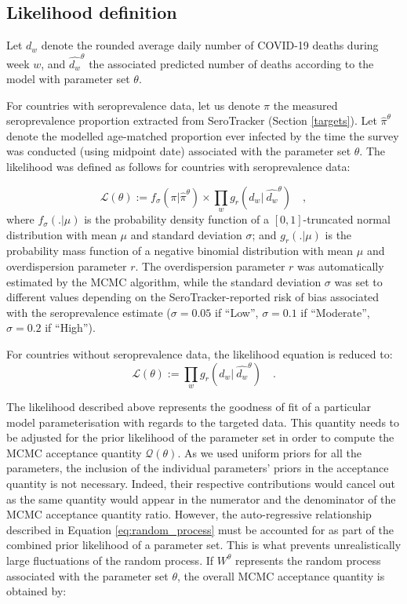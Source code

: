 

\subsection{Likelihood definition}
\label{likelihood}
Let $d_w$ denote the rounded average daily number of COVID-19 deaths during week $w$, and $\hat{d_w}^\theta$ 
the associated predicted number of deaths according to the model with parameter set $\theta$. 

For countries with seroprevalence data, let us denote $\pi$ the measured seroprevalence proportion extracted from SeroTracker (Section \ref{targets}). 
Let $\hat{\pi}^\theta$ denote the modelled age-matched proportion ever infected by the time the survey was conducted (using midpoint date) 
associated with the parameter set $\theta$. 
The likelihood was defined as follows for countries with seroprevalence data:

\begin{equation}
    \label{eq:likelihood}
    \mathcal{L}(\theta) := f_{\sigma}(\pi | \hat{\pi}^\theta) \times \prod_w g_r(d_w | \:\hat{d_w}^\theta) \quad ,
\end{equation}
where $f_{\sigma}( . | \mu )$ is the probability density function of a $[0, 1]$-truncated normal distribution with mean $\mu$ and standard deviation $\sigma$; and 
$g_r(. | \mu)$ is the probability mass function of a negative binomial distribution with mean $\mu$ and 
overdispersion parameter $r$. The overdispersion parameter $r$ was automatically estimated by the MCMC algorithm, while the standard deviation $\sigma$ was set to different 
values depending on the SeroTracker-reported risk of bias associated with the seroprevalence estimate ($\sigma=0.05$ if ``Low'', $\sigma=0.1$ if ``Moderate'', $\sigma=0.2$ if ``High''). 

For countries without seroprevalence data, the likelihood equation is reduced to:
\begin{equation}
    \label{eq:likelihood_nosero}
    \mathcal{L}(\theta) := \prod_w g_r(d_w | \:\hat{d_w}^\theta) \quad.
\end{equation}

The likelihood described above represents the goodness of fit of a particular model parameterisation with regards to the targeted data. 
This quantity needs to be adjusted for the prior likelihood of the parameter set in order to compute the MCMC acceptance quantity $\mathcal{Q}(\theta)$.
As we used uniform priors for all the parameters, the inclusion of the individual parameters' priors in the acceptance quantity is not necessary. 
Indeed, their respective contributions would cancel out as the same quantity would appear in the numerator and the denominator of the 
MCMC acceptance quantity ratio. However, the auto-regressive relationship described in Equation \ref{eq:random_process}
must be accounted for as part of the combined prior likelihood of a parameter set. This is what prevents unrealistically large fluctuations of the random process.
If $W^\theta$ represents the random process associated with the parameter set $\theta$, the overall MCMC acceptance quantity is obtained by:

